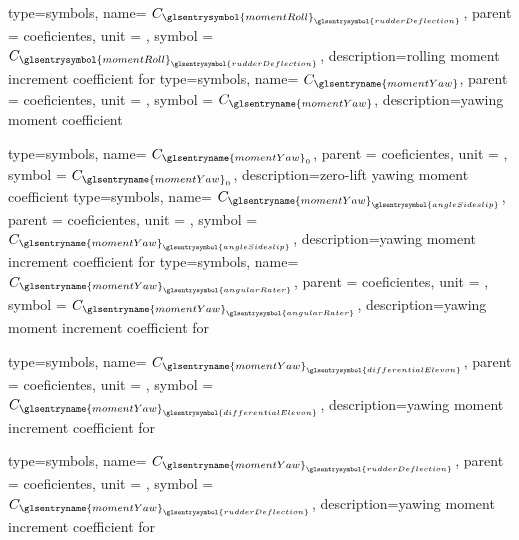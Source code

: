 {type=symbols,
    name= \ensuremath{C_{{\glsentrysymbol{momentRoll}}_{\glsentrysymbol{rudderDeflection}}}},
    parent = {coeficientes},
    unit = \unexpanded{},
    symbol = \ensuremath{C_{{\glsentrysymbol{momentRoll}}_{\glsentrysymbol{rudderDeflection}}}},
    description={rolling moment increment coefficient for }
}
{type=symbols,
    name= \ensuremath{C_\glsentryname{momentYaw}},
    parent = {coeficientes},
    unit = \unexpanded{},
    symbol = \ensuremath{C_\glsentryname{momentYaw}},
    description={yawing moment coefficient}
}

{type=symbols,
    name= \ensuremath{C_{\glsentryname{momentYaw}_{0}}},
    parent = {coeficientes},
    unit = \unexpanded{},
    symbol = \ensuremath{C_{\glsentryname{momentYaw}_{0}}},
    description={zero-lift yawing moment coefficient}
}
{type=symbols,
    name= \ensuremath{C_{{\glsentryname{momentYaw}}_{\glsentrysymbol{angleSideslip}}}},
    parent = {coeficientes},
    unit = \unexpanded{},
    symbol = \ensuremath{C_{{\glsentryname{momentYaw}}_{\glsentrysymbol{angleSideslip}}}},
    description={yawing moment increment coefficient for }
}
{type=symbols,
    name= \ensuremath{C_{{\glsentryname{momentYaw}}_{\glsentrysymbol{angularRater}}}},
    parent = {coeficientes},
    unit = \unexpanded{},
    symbol = \ensuremath{C_{{\glsentryname{momentYaw}}_{\glsentrysymbol{angularRater}}}},
    description={yawing moment increment coefficient for }
}

{type=symbols,
    name= \ensuremath{C_{{\glsentryname{momentYaw}}_{\glsentrysymbol{differentialElevon}}}},
    parent = {coeficientes},
    unit = \unexpanded{},
    symbol = \ensuremath{C_{{\glsentryname{momentYaw}}_{\glsentrysymbol{differentialElevon}}}},
    description={yawing moment increment coefficient for }
}

{type=symbols,
    name= \ensuremath{C_{{\glsentryname{momentYaw}}_{\glsentrysymbol{rudderDeflection}}}},
    parent = {coeficientes},
    unit = \unexpanded{},
    symbol = \ensuremath{C_{{\glsentryname{momentYaw}}_{\glsentrysymbol{rudderDeflection}}}},
    description={yawing moment increment coefficient for }
}

